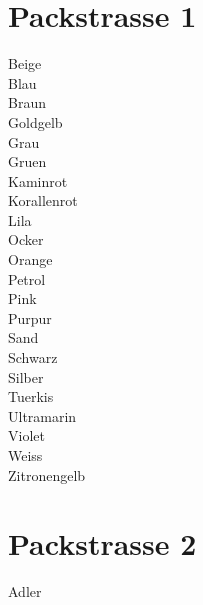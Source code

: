 \documentclass{article}
\begin{document}
\centering

\newpage
\section{Packstrasse 1}
\fontsize{15}{18} \selectfont
Beige
\\

Blau
\\


Braun
\\


Goldgelb
\\


Grau
\\


Gruen
\\


Kaminrot
\\


Korallenrot
\\


Lila
\\


Ocker
\\


Orange
\\


Petrol
\\


Pink
\\


Purpur
\\


Sand
\\


Schwarz
\\


Silber
\\


Tuerkis
\\


Ultramarin
\\


Violet
\\


Weiss
\\


Zitronengelb
\\

\newpage
\section{Packstrasse 2}


Adler
\\
\end{document}
